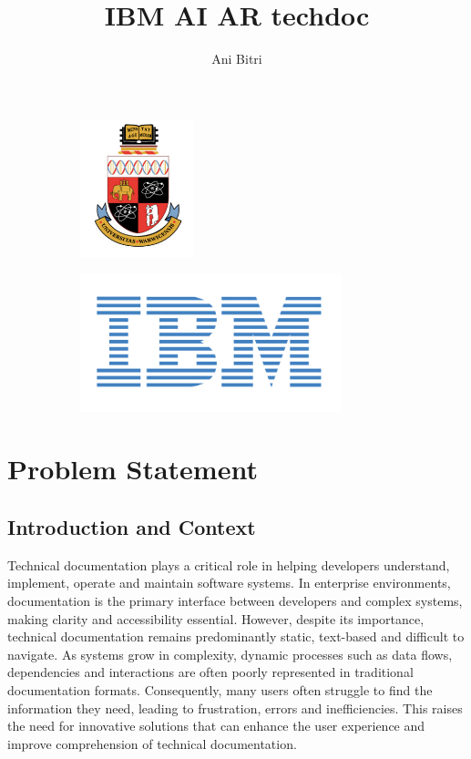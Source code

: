 \documentclass[12pt]{article}
\title{IBM AI AR techdoc}
\author{Ani Bitri}
\begin{document}
\begin{figure}
    \centering
    \begin{subfigure}[b]{0.45\textwidth}
        \centering
        \includegraphics[height=4cm]{img/WarwickCrest.png}
        \label{fig:WarwickCrest}
    \end{subfigure}
    \hfill
    \begin{subfigure}[b]{0.45\textwidth}
        \centering
        \includegraphics[height=4cm]{img/IBM_Logo.png}
        \label{fig:IBM_Logo}
    \end{subfigure}
\end{figure}
\maketitle

\tableofcontents
\newpage

\section{Problem Statement}

    \subsection{Introduction and Context}

        Technical documentation plays a critical role in helping developers understand, implement, operate and maintain software systems. In enterprise environments, documentation is the primary interface between developers and complex
        systems, making clarity and accessibility essential. However, despite its importance, technical documentation remains predominantly static, text-based and difficult to navigate. As systems grow in complexity, dynamic processes such
        as data flows, dependencies and interactions are often poorly represented in traditional documentation formats. Consequently, many users often struggle to find the information they need, leading to frustration, errors and inefficiencies. This 
        raises the need for innovative solutions that can enhance the user experience and improve comprehension of technical documentation.
\end{document}
